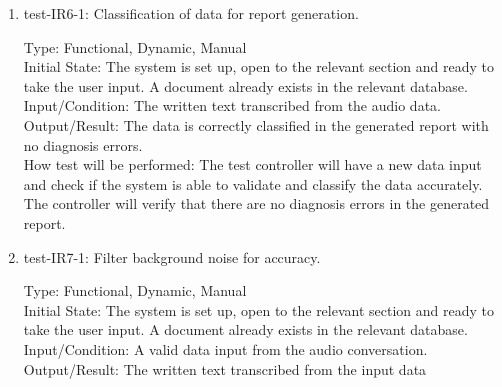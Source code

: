 \documentclass[12pt, titlepage]{article}
\begin{document}
\begin{enumerate}
    \item{test-IR6-1}: Classification of data for report generation. \label{test-IR6-1}
    
    Type: Functional, Dynamic, Manual\\
    
    Initial State: The system is set up, open to the relevant section and ready to take the user input. A document already exists in the relevant database.\\
    
    Input/Condition: The written text transcribed from the audio data.\\
    
    Output/Result: The data is correctly classified in the generated report with no diagnosis errors.\\
    
    How test will be performed: The test controller will have a new data input and check if the system is able to validate and classify the data accurately. The controller will verify that there are no diagnosis errors in the generated report.\\

    \item{test-IR7-1}: Filter background noise for accuracy. \label{test-IR7-1}
    
    Type: Functional, Dynamic, Manual\\
    
    Initial State: The system is set up, open to the relevant section and ready to take the user input. A document already exists in the relevant database.\\
    
    Input/Condition: A valid data input from the audio conversation.\\
    
    Output/Result: The written text transcribed from the input data  


\end{enumerate}

\newpage
\end{document}
